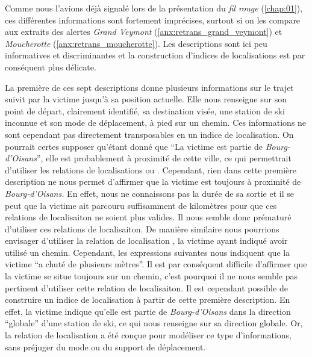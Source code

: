 Comme nous l'avions déjà signalé lors de la présentation du \emph{fil
  rouge} (\autoref{chap:01}), ces différentes informations sont
fortement imprécises, surtout si on les compare aux extraits des
alertes \emph{Grand Veymont} (\autoref{anx:retrans_grand_veymont}) et
\emph{Moucherotte} (\autoref{anx:retrans_moucherotte}). Les
descriptions sont ici peu informatives et discriminantes et la
construction d'indices de localisations est par conséquent plus
délicate.

La première de ces sept descriptions donne plusieurs informations sur
le trajet suivit par la victime jusqu'à sa position actuelle. Elle
nous renseigne sur son point de départ, clairement identifié, sa
destination visée, une station de ski inconnue et son mode de
déplacement, à pied sur un chemin. Ces informations ne sont cependant
pas directement transposables en un indice de localisation. On
pourrait certes supposer qu'étant donné que \enquote{La victime est
  partie de \emph{Bourg-d'Oisans}}, elle est probablement à proximité
de cette ville, ce qui permettrait d'utiliser les relations de
localisations  ou
. Cependant, rien dans cette première description
ne nous permet d'affirmer que la victime est toujours à proximité de
\emph{Bourg-d'Oisans.} En effet, nous ne connaissons pas la durée de
sa sortie et il se peut que la victime ait parcouru suffisamment de
kilomètres pour que ces relations de localisaiton ne soient plus
valides. Il nous semble donc prématuré d'utiliser ces relations de
localisaiton. De manière similaire nous pourrions envisager d'utiliser
la relation de localisation
, la victime
ayant indiqué avoir utilisé un chemin. Cependant, les expressions
suivantes nous indiquent que la victime \enquote{a chuté de plusieurs
  mètres}. Il est par conséquent difficile d'affirmer que la victime
se situe toujours sur un chemin, c'est pourquoi il ne nous semble pas
pertinent d'utiliser cette relation de localisaiton. Il est cependant
possible de construire un indice de localisation à partir de cette
première description. En effet, la victime indique qu'elle est partie
de \emph{Bourg-d'Oisans} dans la direction \enquote{globale} d'une
station de ski, ce qui nous renseigne sur sa direction globale. Or, la
relation de localisation
 a été conçue pour
modéliser ce type d'informations, sans préjuger du mode ou du support
de déplacement.

